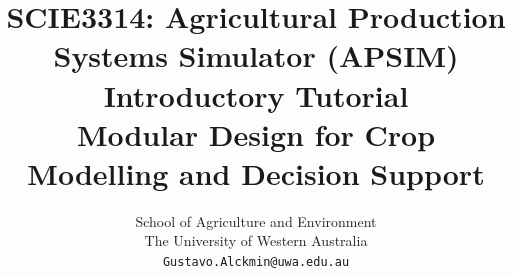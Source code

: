 % 
%




\makeatletter
\renewcommand{\maketitle}{%
  \thispagestyle{empty}
  \begin{tikzpicture}[remember picture, overlay]
    \node[anchor=north west, fill=UWABlue, minimum width=\paperwidth, minimum height=7.5cm] 
      (header) at (current page.north west) {};
    \node[anchor=south west, fill=UWAGold, minimum width=\paperwidth, minimum height=0.55cm] 
      at (header.south west) {};
    \node[anchor=west, text=white, font=\Huge\bfseries, text width=15cm, inner sep=0pt, align=left]
      at ([xshift=2.5cm, yshift=-2.5cm]current page.north west) {\@title};
    \node[anchor=west, text=white, font=\large, inner sep=0pt, align=left]
      at ([xshift=2.5cm, yshift=-5.5cm]current page.north west) {\@author};
    \node[anchor=west, text=white, font=\normalsize, inner sep=0pt, align=left]
      at ([xshift=2.5cm, yshift=-6.5cm]current page.north west) {\@date};
  \end{tikzpicture}
  \vspace*{8.5cm}
}
\makeatother

\title{%
  SCIE3314: Agricultural Production \\[0.2em]%
  Systems Simulator (APSIM) \\[0.3em]%
  \large Introductory Tutorial \\
  \normalsize Modular Design for Crop Modelling and Decision Support
}

\author{
  School of Agriculture and Environment \\
  The University of Western Australia \\
  \texttt{Gustavo.Alckmin@uwa.edu.au}
}

